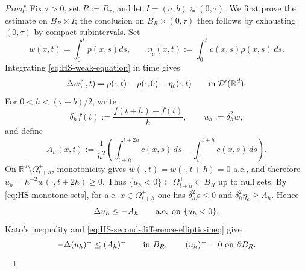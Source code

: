 \documentclass[11pt]{amsart}
\numberwithin{equation}{section}
\numberwithin{figure}{section}
\theoremstyle{plain}
\theoremstyle{definition}
\theoremstyle{remark}
\theoremstyle{plain}
\def\R{\mathbb{R}}
\begin{document}
\begin{proof}
Fix \(\tau>0\), set \(R:=R_\tau\), and let
\(I=(a,b)\Subset(0,\tau)\).  We first prove the estimate on
\(B_R\times I\); the conclusion on \(B_R\times(0,\tau)\) then follows by
exhausting \((0,\tau)\) by compact subintervals.
Set
\[
    w(x,t)=\int_{0}^tp(x,s)ds, \qquad \eta_c(x,t):=\int_0^t c(x,s)\rho(x,s)\,ds .
\]
Integrating \eqref{eq:HS-weak-equation} in time gives
\begin{equation}\label{eq:HS-Baiocchi-equation}
    \Delta w(\cdot,t)
    =
    \rho(\cdot,t)-\rho(\cdot,0)-\eta_c(\cdot,t)
    \qquad\hbox{in }\mathcal D'(\R^d).
\end{equation}
For \(0<h<(\tau-b)/2\), write
\[
    \delta_h f(t):=\frac{f(t+h)-f(t)}{h},
    \qquad
    u_h:=\delta_h^2w,
\]
and define
\begin{equation}\label{eq:HS-source-second-average}
    A_h(x,t):=\frac1{h^2}
    \left(\int_{t+h}^{t+2h}c(x,s)\,ds-\int_t^{t+h}c(x,s)\,ds\right).
\end{equation}
On \(\R^d\setminus\Omega_{t+h}^{+}\), monotonicity gives
\(w(\cdot,t)=w(\cdot,t+h)=0\) a.e., and therefore
\(u_h=h^{-2}w(\cdot,t+2h)\geq0\).  Thus
\(\{u_h<0\}\subset\Omega_{t+h}^{+}\subset B_R\) up to null sets.
By \eqref{eq:HS-monotone-sets}, for a.e. \(x\in\Omega_{t+h}^{+}\) one has
\(\delta_h^2\rho\leq0\) and \(\delta_h^2\eta_c\geq A_h\).  Hence
\begin{equation}\label{eq:HS-second-difference-elliptic-ineq}
    \Delta u_h\leq -A_h
    \qquad\hbox{a.e. on }\{u_h<0\}.
\end{equation}
Kato's inequality and
\eqref{eq:HS-second-difference-elliptic-ineq} give
\begin{equation}\label{eq:HS-negative-second-difference-kato}
    -\Delta(u_h)^-
    \leq (A_h)^-
    \qquad\hbox{in }B_R,
    \qquad
    (u_h)^-=0\hbox{ on }\partial B_R .
\end{equation}


\end{proof}
\end{document}
